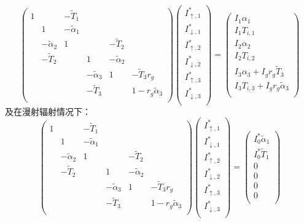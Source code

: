 \begin{equation}
\left(\begin{matrix}1&&-{\widetilde{T}}_1&&&\\&1&-{\widetilde{\alpha}}_1&&&\\&-{\widetilde{\alpha}}_2&1&&-{\widetilde{T}}_2&\\&-{\widetilde{T}}_2&&1&-{\widetilde{\alpha}}_2&\\&&&-{\widetilde{\alpha}}_3&1&-{\widetilde{T}}_3r_g\\&&&-{\widetilde{T}}_3&&1-r_g{\widetilde{\alpha}}_3\\\end{matrix}\right)\left(\begin{matrix}I_{\uparrow,1}^\ast\\I_{\downarrow,1}^\ast\\I_{\uparrow,2}^\ast\\I_{\downarrow,2}^\ast\\I_{\uparrow,3}^\ast\\I_{\downarrow,3}^\ast\\\end{matrix}\right)=\left(\begin{matrix}I_1\alpha_1\\I_1T_{i,1}\\I_2\alpha_2\\I_2T_{i,2}\\I_3\alpha_3+I_gr_g{\widetilde{T}}_3\\I_3T_{i,3}+I_gr_g{\widetilde{\alpha}}_3\\\end{matrix}\right)
\end{equation}
及在漫射辐射情况下：
\begin{equation}
\left(\begin{matrix}1&&-{\widetilde{T}}_1&&&\\&1&-{\widetilde{\alpha}}_1&&&\\&-{\widetilde{\alpha}}_2&1&&-{\widetilde{T}}_2&\\&-{\widetilde{T}}_2&&1&-{\widetilde{\alpha}}_2&\\&&&-{\widetilde{\alpha}}_3&1&-{\widetilde{T}}_3r_g\\&&&-{\widetilde{T}}_3&&1-r_g{\widetilde{\alpha}}_3\\\end{matrix}\right)\left(\begin{matrix}I_{\uparrow,1}^\ast\\I_{\downarrow,1}^\ast\\I_{\uparrow,2}^\ast\\I_{\downarrow,2}^\ast\\I_{\uparrow,3}^\ast\\I_{\downarrow,3}^\ast\\\end{matrix}\right)=\left(\begin{matrix}I_0^\ast{\widetilde{\alpha}}_1\\I_0^\ast{\widetilde{T}}_1\\0\\0\\0\\0\\\end{matrix}\right)
\end{equation}
